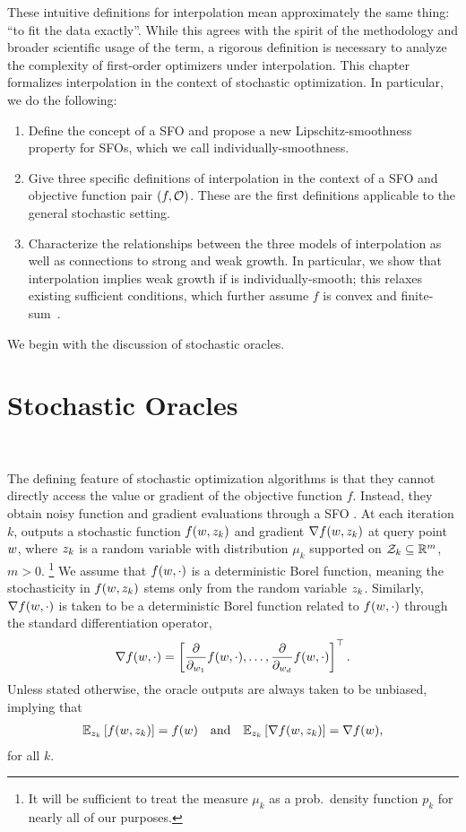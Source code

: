 These intuitive definitions for interpolation mean approximately the same thing: ``to fit the data exactly''. 
While this agrees with the spirit of the methodology and broader scientific usage of the term, a rigorous definition is necessary to analyze the complexity of first-order optimizers under interpolation. 
This chapter formalizes interpolation in the context of stochastic optimization. 
In particular, we do the following:
\begin{enumerate}
    \item Define the concept of a \ac{SFO} \oracle{} and propose a new Lipschitz-smoothness property for \acp{SFO}, which we call individually-smoothness. 
    \item Give three specific definitions of interpolation in the context of a \acl{SFO} and objective function pair \( \rbr{f, \oracle{}} \). 
    These are the first definitions applicable to the general stochastic setting.
    \item Characterize the relationships between the three models of interpolation as well as connections to strong and weak growth. 
In particular, we show that interpolation implies weak growth if \oracle{} is individually-smooth; this relaxes existing sufficient conditions, which further assume \( f \) is convex and finite-sum~\citep{vaswani2019fast}. 
\end{enumerate}
We begin with the discussion of stochastic oracles.

\section{Stochastic Oracles}~\label{sec:stochastic-oracles}

The defining feature of stochastic optimization algorithms is that they cannot directly access the value or gradient of the objective function \( f \).
Instead, they obtain noisy function and gradient evaluations through a \ac{SFO}  \oracle. 
At each iteration \( k \), \oracle{} outputs a stochastic function \( f(\w, \zk) \) and gradient \( \grad(\w, \zk) \) at query point \( \w \), where \( \zk \) is a random variable with distribution \( \mu_k \) supported on \( \calZ_k \subseteq \R^m \), \( m > 0 \).%
\footnote{It will be sufficient to treat the measure \( \mu_k \) as a prob.\ density function \( p_k \) for nearly all of our purposes.}
We assume that \( f(\w, \cdot) \) is a deterministic Borel function, meaning the stochasticity in \( f(\w, \zk) \) stems only from the random variable \( \zk \).
Similarly, \( \grad(\w, \cdot) \) is taken to be a deterministic Borel function related to \( f(\w, \cdot) \) through the standard differentiation operator,
\[ \grad(\w, \cdot) = \sbr{\frac{\partial}{\partial_{w_1}} f(\w, \cdot), \ldots, \frac{\partial}{\partial_{w_d}} f(\w, \cdot)}^\top. \]
Unless stated otherwise, the oracle outputs are always taken to be unbiased, implying that 
\begin{align*}
    \E_{\zk} \sbr{f(\w, \zk)} = f(\w) \quad \text{and} \quad \Ek \sbr{\grad(\w, \zk)} = \grad(\w), 
\end{align*}
for all \( k \).

